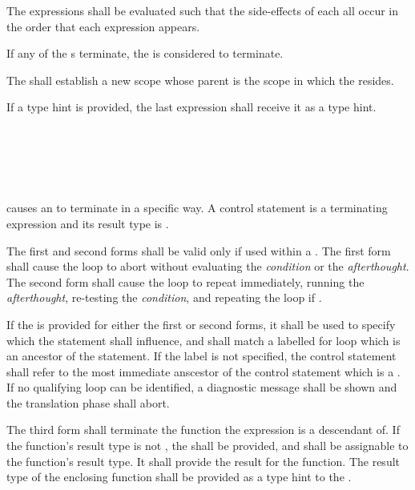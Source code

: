 \specsubsubitem
The expressions shall be evaluated such that the side-effects of each all occur
in the order that each expression appears.

\specsubsubitem
If any of the s terminate, the
 is considered to terminate.

\specsubsubitem
The  shall establish a new scope whose parent is
the scope in which the  resides.

\specsubsubitem
If a type hint is provided, the last expression shall receive it as a type hint.


\begin{grammar}
 \\
	  \\
	  \\
	  \\
\end{grammar}

\specsubsubitem
{} causes an  to
terminate in a specific way. A control statement is a terminating expression
and its result type is .

\specsubsubitem
The first and second forms shall be valid only if used within a
. The first form shall cause the loop to abort without
evaluating the \textit{condition} or the \textit{afterthought}. The second form
shall cause the loop to repeat immediately, running the \textit{afterthought},
re-testing the \textit{condition}, and repeating the loop if .

\specsubsubitem
If the  is provided for either the first or second forms, it
shall be used to specify which  the statement shall
influence, and shall match a labelled for loop which is an ancestor of the
statement. If the label is not specified, the control statement shall refer to
the most immediate anscestor of the control statement which is a
. If no qualifying loop can be identified, a diagnostic
message shall be shown and the translation phase shall abort.

\specsubsubitem
The third form shall terminate the function the expression is a descendant of.
If the function's result type is not , the
 shall be provided, and shall be assignable to the
function's result type. It shall provide the result for the function. The
result type of the enclosing function shall be provided as a type hint to the
.


